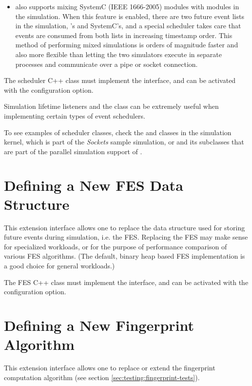 \begin{itemize}
\item {\opp} also supports mixing SystemC (IEEE 1666-2005) modules with {\opp}
    modules in the simulation. When this feature is enabled, there are two
    future event lists in the simulation, {\opp}'s and SystemC's, and a
    special scheduler takes care that events are consumed from both lists in
    increasing timestamp order. This method of performing mixed simulations is
    orders of magnitude faster and also more flexible than letting the two
    simulators execute in separate processes and communicate over a pipe or
    socket connection.
\end{itemize}

The scheduler C++ class must implement the  interface,
and can be activated with the  configuration option.

Simulation lifetime listeners and the  class can be extremely
useful when implementing certain types of event schedulers.

To see examples of scheduler classes, check the
 and  classes in
the simulation kernel,  which is part of the
\textit{Sockets} sample simulation, or  and its
subclasses that are part of the parallel simulation support of {\opp}.


\section{Defining a New FES Data Structure}
\label{sec:plugin-exts:fes}

This extension interface allows one to replace the data structure used for
storing future events during simulation, i.e. the FES. Replacing the FES
may make sense for specialized workloads, or for the purpose of performance
comparison of various FES algorithms. (The default, binary heap based FES
implementation is a good choice for general workloads.)

The FES C++ class must implement the  interface,
and can be activated with the  configuration option.


\section{Defining a New Fingerprint Algorithm}
\label{sec:plugin-exts:fingerprint}

This extension interface allows one to replace or extend the fingerprint
computation algorithm (see section \ref{sec:testing:fingerprint-tests}).

